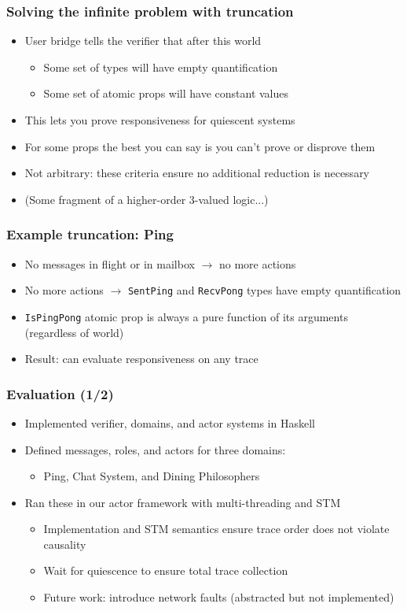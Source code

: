 \documentclass[12pt,aspectratio=169]{beamer}
\begin{document}
\begin{frame}
\frametitle{Solving the infinite problem with truncation}
\begin{itemize}
  \item User bridge tells the verifier that after this world
  \begin{itemize}
    \item Some set of types will have empty quantification
    \item Some set of atomic props will have constant values
  \end{itemize}
  \item This lets you prove responsiveness for quiescent systems
  \item For some props the best you can say is you can't prove or disprove them
  \item Not arbitrary: these criteria ensure no additional reduction is necessary
  \item (Some fragment of a higher-order 3-valued logic...)
\end{itemize}
\end{frame}

\begin{frame}
\frametitle{Example truncation: Ping}
\begin{itemize}
  \item No messages in flight or in mailbox $\rightarrow$ no more actions
  \item No more actions $\rightarrow$ \texttt{SentPing} and \texttt{RecvPong} types have empty quantification
  \item \texttt{IsPingPong} atomic prop is always a pure function of its arguments (regardless of world)
  \item Result: can evaluate responsiveness on any trace
\end{itemize}
\end{frame}

\begin{frame}
\frametitle{Evaluation (1/2)}
\begin{itemize}
  \item Implemented verifier, domains, and actor systems in Haskell
  \item Defined messages, roles, and actors for three domains:
  \begin{itemize}
    \item Ping, Chat System, and Dining Philosophers
  \end{itemize}
  \item Ran these in our actor framework with multi-threading and STM
  \begin{itemize}
    \item Implementation and STM semantics ensure trace order does not violate causality
    \item Wait for quiescence to ensure total trace collection
    \item Future work: introduce network faults (abstracted but not implemented)
  \end{itemize}
\end{itemize}
\end{frame}
\end{document}
